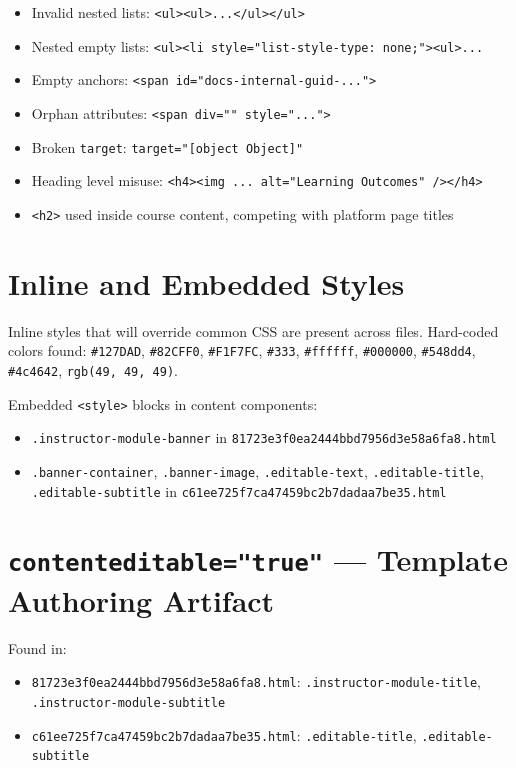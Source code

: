 \begin{itemize}
  \item Invalid nested lists: \texttt{<ul><ul>...</ul></ul>}
  \item Nested empty lists: \texttt{<ul><li style="list-style-type: none;"><ul>...}
  \item Empty anchors: \texttt{<span id="docs-internal-guid-...">}
  \item Orphan attributes: \texttt{<span div="" style="...">}
  \item Broken \texttt{target}: \texttt{target="[object Object]"}
  \item Heading level misuse: \texttt{<h4><img ... alt="Learning Outcomes" /></h4>}
  \item \texttt{<h2>} used inside course content, competing with platform page titles
\end{itemize}

\section{Inline and Embedded Styles}

Inline styles that will override common CSS are present across files.
Hard-coded colors found: \texttt{\#127DAD}, \texttt{\#82CFF0},
\texttt{\#F1F7FC}, \texttt{\#333}, \texttt{\#ffffff}, \texttt{\#000000},
\texttt{\#548dd4}, \texttt{\#4c4642}, \texttt{rgb(49, 49, 49)}.

Embedded \texttt{<style>} blocks in content components:

\begin{itemize}
  \item \texttt{.instructor-module-banner} in
        \texttt{81723e3f0ea2444bbd7956d3e58a6fa8.html}
  \item \texttt{.banner-container}, \texttt{.banner-image},
        \texttt{.editable-text}, \texttt{.editable-title},
        \texttt{.editable-subtitle} in
        \texttt{c61ee725f7ca47459bc2b7dadaa7be35.html}
\end{itemize}

\section{\texttt{contenteditable="true"} — Template Authoring Artifact}

Found in:

\begin{itemize}
  \item \texttt{81723e3f0ea2444bbd7956d3e58a6fa8.html}:
        \texttt{.instructor-module-title}, \texttt{.instructor-module-subtitle}
  \item \texttt{c61ee725f7ca47459bc2b7dadaa7be35.html}:
        \texttt{.editable-title}, \texttt{.editable-subtitle}
\end{itemize}

